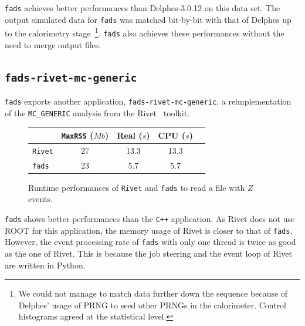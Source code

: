\documentclass[a4paper]{jpconf}
\begin{document}
\texttt{fads} achieves better performances than Delphes-3.0.12 on this data set.
The output simulated data for \texttt{fads} was matched bit-by-bit with that of Delphes up to the calorimetry stage~\footnote{We could not manage to match data further down the sequence because of Delphes' usage of PRNG to seed other PRNGs in the calorimeter. Control histograms agreed at the statistical level.}.
\texttt{fads} also achieves these performances without the need to merge output files.


\subsection{\texttt{fads-rivet-mc-generic}}

\texttt{fads} exports another application, \texttt{fads-rivet-mc-generic}, a reimplementation of the \texttt{MC\_GENERIC} analysis from the Rivet~\cite{ref-rivet} toolkit.

\begin{figure}[h]
\begin{center}
  \begin{tabular}{ l | c | c | c | c }
	   & \texttt{MaxRSS} ($Mb$) & Real ($s$) & CPU ($s$) \\
    \hline
	   \texttt{Rivet} & 27 & 13.3 & 13.3 \\
	   \texttt{fads} & 23 & 5.7 & 5.7 \\
    \hline
  \end{tabular}
	\caption{\label{fig-rivet-perf-tab}Runtime performances of \texttt{Rivet} and \texttt{fads} to read a file with $Z$ events.}
\end{center}
\end{figure}

\texttt{fads} shows better performances than the \texttt{C++} application.
As Rivet does not use ROOT for this application, the memory usage of Rivet is closer to that of \texttt{fads}.
However, the event processing rate of \texttt{fads} with only one thread is twice as good as the one of Rivet.
This is because the job steering and the event loop of Rivet are written in Python.
\end{document}
